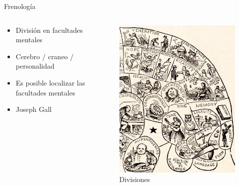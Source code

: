 \documentclass{beamer}
\begin{document}
\begin{frame}{Frenología}
	\transfade
\begin{columns}
\begin{column}{0.5\textwidth}
\begin{itemize}
    \item División en facultades mentales
    \item Cerebro / craneo / personalidad
    \item Es posible localizar las facultades mentales
    \item Joseph Gall
\end{itemize}
\end{column}
\pause
\begin{column}{0.5\textwidth}
\begin{figure}
    \centering
    \includegraphics[width=0.9\linewidth]{frenologia1.jpg}
    \caption{Divisiones}
    \label{fig:my_label}
\end{figure}
\end{column}	
\end{columns}
\end{frame}
\end{document}
